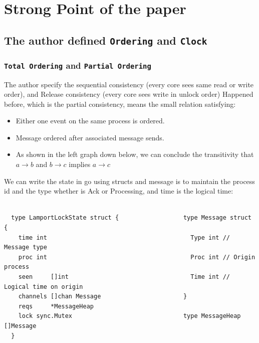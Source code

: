 \documentclass[acmlarge]{acmart}
\begin{document}



\maketitle

\section{Strong Point of the paper}


\subsection {The author defined \texttt{Ordering} and \texttt{Clock}}
\subsubsection{\texttt{Total Ordering} and \texttt{Partial Ordering}}
The author specify the sequential consistency (every core sees same read or write order),
and Release consistency (every core sees write in unlock order)
Happened before, which is the partial consistency, means the small relation satisfying:
\begin{itemize}
  \item Either one event on the same process is ordered.
  \item Message ordered after associated message sends.
  \item As shown in the left graph down below, we can conclude the
        transitivity that $a \rightarrow b$ and $b \rightarrow c$ implies $a \rightarrow c$
\end{itemize}

We can write the state in go using structs and message is to maintain the process id and the type whether is Ack or Processing,
and time is the logical time:

\begin{lstlisting}

  type LamportLockState struct {                  type Message struct {
    time int                                      	Type int // Message type
    proc int                                      	Proc int // Origin process
    seen     []int                                	Time int // Logical time on origin
    channels []chan Message                       }
    reqs     *MessageHeap                         
    lock sync.Mutex                               type MessageHeap []Message
  }                 
  \end{lstlisting}
\end{document}

